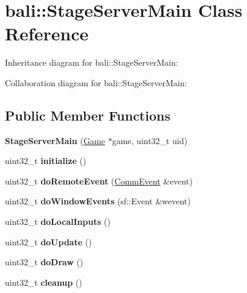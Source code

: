 \hypertarget{classbali_1_1_stage_server_main}{\section{bali\-:\-:Stage\-Server\-Main Class Reference}
\label{classbali_1_1_stage_server_main}
}


Inheritance diagram for bali\-:\-:Stage\-Server\-Main\-:


Collaboration diagram for bali\-:\-:Stage\-Server\-Main\-:
\subsection*{Public Member Functions}
\begin{DoxyCompactItemize}
\item 
\hypertarget{classbali_1_1_stage_server_main_a92482b0eb81722cfb65d19ad8898ec0c}{{\bfseries Stage\-Server\-Main} (\hyperlink{classbali_1_1_game}{Game} $\ast$game, uint32\-\_\-t uid)}\label{classbali_1_1_stage_server_main_a92482b0eb81722cfb65d19ad8898ec0c}

\item 
\hypertarget{classbali_1_1_stage_server_main_addd69c8a15d11918c5fd69118fa6a171}{uint32\-\_\-t {\bfseries initialize} ()}\label{classbali_1_1_stage_server_main_addd69c8a15d11918c5fd69118fa6a171}

\item 
\hypertarget{classbali_1_1_stage_server_main_aa4d4953f5101525e9847b154be00df41}{uint32\-\_\-t {\bfseries do\-Remote\-Event} (\hyperlink{classbali_1_1_comm_event}{Comm\-Event} \&event)}\label{classbali_1_1_stage_server_main_aa4d4953f5101525e9847b154be00df41}

\item 
\hypertarget{classbali_1_1_stage_server_main_a65b2ae0c086c19f0b2b2e9a69265d197}{uint32\-\_\-t {\bfseries do\-Window\-Events} (sf\-::\-Event \&wevent)}\label{classbali_1_1_stage_server_main_a65b2ae0c086c19f0b2b2e9a69265d197}

\item 
\hypertarget{classbali_1_1_stage_server_main_a4aab79057ae7c7d4a7fe96dccc51dfb8}{uint32\-\_\-t {\bfseries do\-Local\-Inputs} ()}\label{classbali_1_1_stage_server_main_a4aab79057ae7c7d4a7fe96dccc51dfb8}

\item 
\hypertarget{classbali_1_1_stage_server_main_a82a6d4547ffd0efed26881711dfbfd83}{uint32\-\_\-t {\bfseries do\-Update} ()}\label{classbali_1_1_stage_server_main_a82a6d4547ffd0efed26881711dfbfd83}

\item 
\hypertarget{classbali_1_1_stage_server_main_ac6a9a005cff3bed2a7ddcfe7a0746064}{uint32\-\_\-t {\bfseries do\-Draw} ()}\label{classbali_1_1_stage_server_main_ac6a9a005cff3bed2a7ddcfe7a0746064}

\item 
\hypertarget{classbali_1_1_stage_server_main_adb82748a9c2bd4c5c3c74c7c08d2a74e}{uint32\-\_\-t {\bfseries cleanup} ()}\label{classbali_1_1_stage_server_main_adb82748a9c2bd4c5c3c74c7c08d2a74e}

\end{DoxyCompactItemize}
